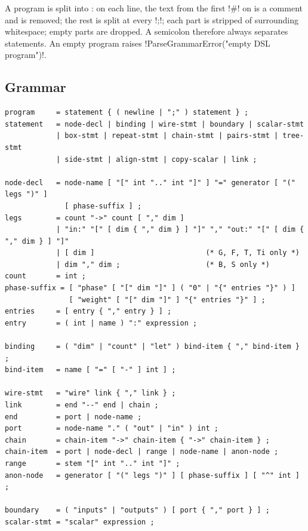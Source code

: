 A program is split into : on each line, the text from the first \code!#! on is a comment and is removed; the rest is split at every \code!;!; each part is stripped of surrounding whitespace; empty parts are dropped. A semicolon therefore always separates statements. An empty program raises \code!ParseGrammarError("empty DSL program")!.

\subsection{Grammar}\label{sec:language-dsl-grammar}

\begin{lstlisting}[style=grammar,caption={DSL grammar. Spaces between tokens are free except where a keyword needs one.},label={lst:language-dsl}]
program     = statement { ( newline | ";" ) statement } ;
statement   = node-decl | binding | wire-stmt | boundary | scalar-stmt
            | box-stmt | repeat-stmt | chain-stmt | pairs-stmt | tree-stmt
            | side-stmt | align-stmt | copy-scalar | link ;

node-decl   = node-name [ "[" int ".." int "]" ] "=" generator [ "(" legs ")" ]
              [ phase-suffix ] ;
legs        = count "->" count [ "," dim ]
            | "in:" "[" [ dim { "," dim } ] "]" "," "out:" "[" [ dim { "," dim } ] "]"
            | [ dim ]                          (* G, F, T, Ti only *)
            | dim "," dim ;                    (* B, S only *)
count       = int ;
phase-suffix = [ "phase" [ "[" dim "]" ] ( "0" | "{" entries "}" ) ]
               [ "weight" [ "[" dim "]" ] "{" entries "}" ] ;
entries     = [ entry { "," entry } ] ;
entry       = ( int | name ) ":" expression ;

binding     = ( "dim" | "count" | "let" ) bind-item { "," bind-item } ;
bind-item   = name [ "=" [ "-" ] int ] ;

wire-stmt   = "wire" link { "," link } ;
link        = end "--" end | chain ;
end         = port | node-name ;
port        = node-name "." ( "out" | "in" ) int ;
chain       = chain-item "->" chain-item { "->" chain-item } ;
chain-item  = port | node-decl | range | node-name | anon-node ;
range       = stem "[" int ".." int "]" ;
anon-node   = generator [ "(" legs ")" ] [ phase-suffix ] [ "^" int ] ;

boundary    = ( "inputs" | "outputs" ) [ port { "," port } ] ;
scalar-stmt = "scalar" expression ;


\end{lstlisting}
